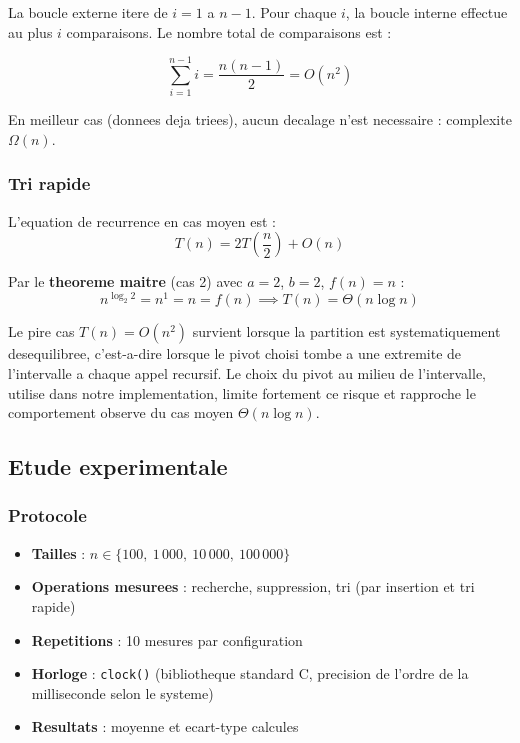 \documentclass[12pt,a4paper]{article}
\begin{document}
La boucle externe itere de $i = 1$ a $n-1$. Pour chaque $i$,
la boucle interne effectue au plus $i$ comparaisons.
Le nombre total de comparaisons est :

\[
\sum_{i=1}^{n-1} i = \frac{n(n-1)}{2} = O(n^2)
\]

En meilleur cas (donnees deja triees), aucun decalage n'est necessaire :
complexite $\Omega(n)$.

\subsubsection{Tri rapide}

L'equation de recurrence en cas moyen est :
\[
T(n) = 2T\!\left(\frac{n}{2}\right) + O(n)
\]

Par le \textbf{theoreme maitre} (cas 2) avec $a=2$, $b=2$, $f(n)=n$ :
\[
n^{\log_2 2} = n^1 = n = f(n) \implies T(n) = \Theta(n \log n)
\]

Le pire cas $T(n) = O(n^2)$ survient lorsque la partition est
systematiquement desequilibree, c'est-a-dire lorsque le pivot choisi
tombe a une extremite de l'intervalle a chaque appel recursif.
Le choix du pivot au milieu de l'intervalle, utilise dans notre
implementation, limite fortement ce risque et rapproche le comportement
observe du cas moyen $\Theta(n \log n)$.

\subsection{Etude experimentale}

\subsubsection{Protocole}

\begin{itemize}
    \item \textbf{Tailles} : $n \in \{100,\ 1\,000,\ 10\,000,\ 100\,000\}$
    \item \textbf{Operations mesurees} : recherche, suppression, tri
          (par insertion et tri rapide)
    \item \textbf{Repetitions} : 10 mesures par configuration
    \item \textbf{Horloge} : \texttt{clock()} (bibliotheque standard C,
          precision de l'ordre de la milliseconde selon le systeme)
    \item \textbf{Resultats} : moyenne et ecart-type calcules
\end{itemize}
\end{document}
